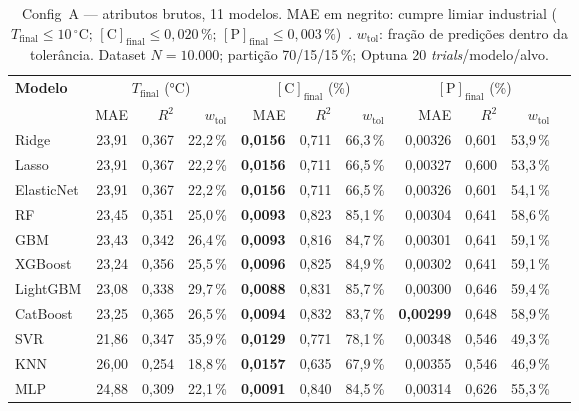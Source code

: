 \begin{table}[H]
\caption{Config~A --- atributos brutos, 11 modelos. MAE em negrito: cumpre limiar industrial ($T_\text{final} \leq 10\,^\circ\text{C}$; $[\text{C}]_\text{final} \leq 0{,}020\,\%$; $[\text{P}]_\text{final} \leq 0{,}003\,\%$)~\cite{zhou2024bof,bae2020bof}. $w_\text{tol}$: fração de predições dentro da tolerância. Dataset $N=10{.}000$; partição 70/15/15\,\%; Optuna 20 \textit{trials}/modelo/alvo.}
\label{tbl:resultados_configA}
\centering
\footnotesize
\setlength{\tabcolsep}{4pt}
\begin{tabular}{lrrrrrrrrrr}
\hline
\textbf{Modelo} &
  \multicolumn{3}{c}{$T_\text{final}$ (°C)} &
  \multicolumn{3}{c}{$[\text{C}]_\text{final}$ (\%)} &
  \multicolumn{3}{c}{$[\text{P}]_\text{final}$ (\%)} \\
\cline{2-4}\cline{5-7}\cline{8-10}
 & MAE & $R^2$ & $w_\text{tol}$ & MAE & $R^2$ & $w_\text{tol}$ & MAE & $R^2$ & $w_\text{tol}$ \\
\hline
Ridge      & 23,91 & 0,367 & 22,2\,\% & \textbf{0,0156} & 0,711 & 66,3\,\% & 0,00326 & 0,601 & 53,9\,\% \\
Lasso      & 23,91 & 0,367 & 22,2\,\% & \textbf{0,0156} & 0,711 & 66,5\,\% & 0,00327 & 0,600 & 53,3\,\% \\
ElasticNet & 23,91 & 0,367 & 22,2\,\% & \textbf{0,0156} & 0,711 & 66,5\,\% & 0,00326 & 0,601 & 54,1\,\% \\
RF         & 23,45 & 0,351 & 25,0\,\% & \textbf{0,0093} & 0,823 & 85,1\,\% & 0,00304 & 0,641 & 58,6\,\% \\
GBM        & 23,43 & 0,342 & 26,4\,\% & \textbf{0,0093} & 0,816 & 84,7\,\% & 0,00301 & 0,641 & 59,1\,\% \\
XGBoost    & 23,24 & 0,356 & 25,5\,\% & \textbf{0,0096} & 0,825 & 84,9\,\% & 0,00302 & 0,641 & 59,1\,\% \\
LightGBM   & 23,08 & 0,338 & 29,7\,\% & \textbf{0,0088} & 0,831 & 85,7\,\% & 0,00300 & 0,646 & 59,4\,\% \\
CatBoost   & 23,25 & 0,365 & 26,5\,\% & \textbf{0,0094} & 0,832 & 83,7\,\% & \textbf{0,00299} & 0,648 & 58,9\,\% \\
SVR        & 21,86 & 0,347 & 35,9\,\% & \textbf{0,0129} & 0,771 & 78,1\,\% & 0,00348 & 0,546 & 49,3\,\% \\
KNN        & 26,00 & 0,254 & 18,8\,\% & \textbf{0,0157} & 0,635 & 67,9\,\% & 0,00355 & 0,546 & 46,9\,\% \\
MLP        & 24,88 & 0,309 & 22,1\,\% & \textbf{0,0091} & 0,840 & 84,5\,\% & 0,00314 & 0,626 & 55,3\,\% \\
\hline
\end{tabular}
\end{table}

